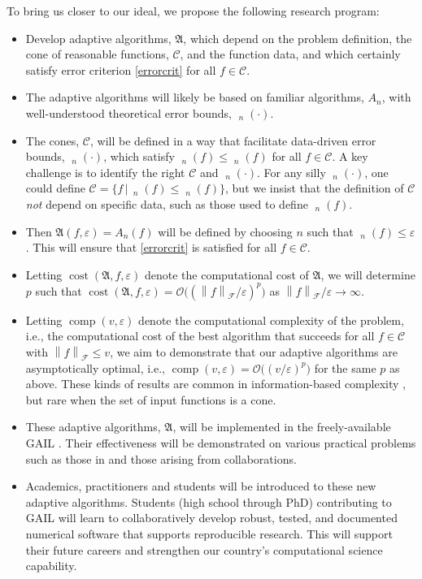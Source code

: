 \documentclass[11pt]{NSFamsart}
\DeclareMathOperator{\cost}{cost}
\DeclareMathOperator{\comp}{comp}
\DeclareMathOperator{\err}{err}
\DeclareMathOperator{\oerr}{\overline{\err}}
\DeclareMathOperator{\herr}{\widehat{\err}}
\newcommand{\cc}{\mathcal{C}}
\newcommand{\calf}{{\mathcal{F}}}
\newcommand{\fA}{\mathfrak{A}}
\newcommand{\norm}[2][{}]{\ensuremath{\left \lVert #2 \right \rVert}_{#1}}
\newcommand{\Order}{\mathcal{O}}
\begin{document}
To bring us closer to our ideal, we propose the following research program:
\begin{itemize}
	\item Develop adaptive algorithms, $\fA$, which depend on the 
	problem definition, the cone of reasonable functions, $\cc$, and the
	function data, and which certainly satisfy error criterion \eqref{errorcrit} for all $f \in \cc$.  
	
	\item The adaptive algorithms will likely be based on familiar algorithms, $A_n$, with 
	well-understood theoretical error bounds, $\oerr_n(\cdot)$.  
	
	\item The cones, $\cc$, will be defined in a way that facilitate data-driven error 
	bounds, $\herr_n(\cdot)$, which satisfy $\oerr_n(f) \le \herr_n(f)$ for all $f\in \cc$.  A key 
	challenge is to identify the right $\cc$ and $\herr_n(\cdot)$.  For any silly 
	$\herr_n(\cdot)$, one could define $\cc = \{f \, \vert \, \oerr_n(f) 
	\le \herr_n(f) \}$, but we insist that the definition of $\cc$ \emph{not} depend on specific data, 
	such as those used to define $\herr_n(f)$.
	
	\item Then $\fA(f,\varepsilon) = A_n(f)$ will be defined by choosing $n$ such that $\herr_n(f) \le 
	\varepsilon$.  This will ensure that \eqref{errorcrit} is satisfied for all $f \in \cc$.  
	
	\item Letting $\cost(\fA,f,\varepsilon)$ denote the computational cost of $\fA$, we will
	determine $p$ such that 
	$\cost(\fA,f,\varepsilon)  = \Order\bigl((\norm[\calf]{f}/\varepsilon)^p\bigr)$ as 
	$\norm[\calf]{f}/\varepsilon 
	\to 
	\infty$.  
	
	\item Letting $\comp(v,\varepsilon)$ denote the computational complexity of the problem, i.e., 
	the computational cost of the best algorithm that succeeds for all $f \in \cc$ with $\norm[\calf]{f} 
	\le v$, we aim to demonstrate that 
	our 
	adaptive algorithms are asymptotically optimal, i.e., $\comp(v,\varepsilon) = \Order 
	\bigl((v/\varepsilon)^p \bigr)$ for the same $p$ as above.  These kinds of results are common in 
	information-based complexity \cite{TraWer98,TraWasWoz88}, but rare when the set of input 
	functions is a cone.
	
	\item These adaptive algorithms, $\fA$, will be implemented in the freely-available GAIL 
	\cite{ChoEtal17b}.  Their 
	effectiveness will be demonstrated on various practical problems such as those in \cite{VirLib17a} 
	and those arising from collaborations.
	
	\item Academics, practitioners and students will be introduced to these 
	new adaptive algorithms.  Students (high school through PhD) contributing to GAIL will learn to 
	collaboratively develop robust, tested, 
	and documented numerical software that supports reproducible research.  This will support their 
	future careers and strengthen our country's computational science capability.
	
\end{itemize}
\end{document}

